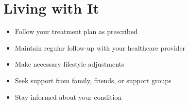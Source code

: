 \section{Living with It}
\begin{itemize}[noitemsep]
  \item Follow your treatment plan as prescribed
  \item Maintain regular follow-up with your healthcare provider
  \item Make necessary lifestyle adjustments
  \item Seek support from family, friends, or support groups
  \item Stay informed about your condition
\end{itemize}
